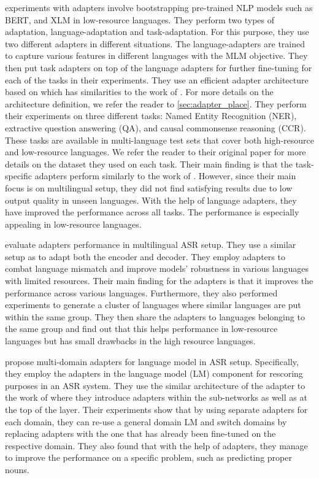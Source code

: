  experiments with adapters involve bootstrapping pre-trained NLP models such as BERT, and XLM  in low-resource languages. They perform two types of adaptation, language-adaptation and task-adaptation. For this purpose, they use two different adapters in different situations. The language-adapters are trained to capture various features in different languages with the MLM objective. They then put task adapters on top of the language adapters for further fine-tuning for each of the tasks in their experiments. They use an efficient adapter architecture based on  which has similarities to the work of . For more details on the architecture definition, we refer the reader to \cref{sec:adapter_place}. They perform their experiments on three different tasks: Named Entity Recognition (NER), extractive question answering (QA), and causal commonsense reasoning (CCR). These tasks are available in multi-language test sets that cover both high-resource and low-resource languages. We refer the reader to their original paper for more details on the dataset they used on each task. Their main finding is that the task-specific adapters perform similarly to the work of . However, since their main focus is on multilingual setup, they did not find satisfying results due to low output quality in unseen languages. With the help of language adapters, they have improved the performance across all tasks. The performance is especially appealing in low-resource languages.

 evaluate adapters performance in multilingual ASR setup. They use a similar setup as  to adapt both the encoder and decoder. They employ adapters to combat language mismatch and improve models' robustness in various languages with limited resources. Their main finding for the adapters is that it improves the performance across various languages. Furthermore, they also performed experiments to generate a cluster of languages where similar languages are put within the same group. They then share the adapters to languages belonging to the same group and find out that this helps performance in low-resource languages but has small drawbacks in the high resource languages.

 propose multi-domain adapters for language model in ASR setup. Specifically, they employ the adapters in the language model (LM) component for rescoring purposes in an ASR system. They use the similar architecture of the adapter to the work of  where they introduce adapters within the sub-networks as well as at the top of the layer. Their experiments show that by using separate adapters for each domain, they can re-use a general domain LM and switch domains by replacing adapters with the one that has already been fine-tuned on the respective domain. They also found that with the help of adapters, they manage to improve the performance on a specific problem, such as predicting proper nouns.

